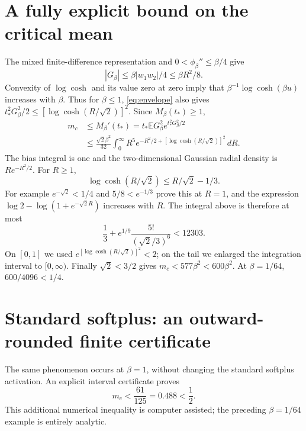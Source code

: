 \documentclass[11pt]{article}
\newcommand{\E}{\mathbb E}
\begin{document}
\section{A fully explicit bound on the critical mean}
The mixed finite-difference representation and
$0<\phi_\beta''\le\beta/4$ give
\[
 |G_\beta|\le\beta|w_1w_2|/4\le\beta R^2/8.
\]
Convexity of $\log\cosh$ and its value zero at zero imply that
$\beta^{-1}\log\cosh(\beta u)$ increases with $\beta$. Thus for
$\beta\le1$, \eqref{eq:envelope} also gives
$t_*^2G_\beta^2/2\le[\log\cosh(R/\sqrt2)]^2$. Since $M_\beta(t_*)\ge1$,
\begin{align*}
 m_c&\le M_\beta'(t_*)
   =t_*\E G_\beta^2e^{t_*^2G_\beta^2/2}\\
 &\le\frac{\sqrt2\beta^2}{32}
   \int_0^\infty R^5
       e^{-R^2/2+[\log\cosh(R/\sqrt2)]^2}\,dR.
\end{align*}
The bias integral is one and the two-dimensional Gaussian radial density
is $R e^{-R^2/2}$. For $R\ge1$,
\[
 \log\cosh(R/\sqrt2)\le R/\sqrt2-1/3.
\]
For example $e^{-\sqrt2}<1/4$ and $5/8<e^{-1/3}$ prove this at $R=1$,
and the expression $\log2-\log(1+e^{-\sqrt2R})$ increases with $R$.
The integral above is therefore at most
\[
 \frac13+e^{1/9}\frac{5!}{(\sqrt2/3)^6}
 <12303.
\]
On $[0,1]$ we used $e^{[\log\cosh(R/\sqrt2)]^2}<2$; on the tail
we enlarged the integration interval to $[0,\infty)$. Finally
$\sqrt2<3/2$ gives $m_c<577\beta^2<600\beta^2$. At $\beta=1/64$,
$600/4096<1/4$.

\section{Standard softplus: an outward-rounded finite certificate}
The same phenomenon occurs at $\beta=1$, without changing the standard
softplus activation. An explicit interval certificate proves
\[
 m_c<\frac{61}{125}=0.488<\frac12.
\]
This additional numerical inequality is computer assisted; the preceding
$\beta=1/64$ example is entirely analytic.
\end{document}
